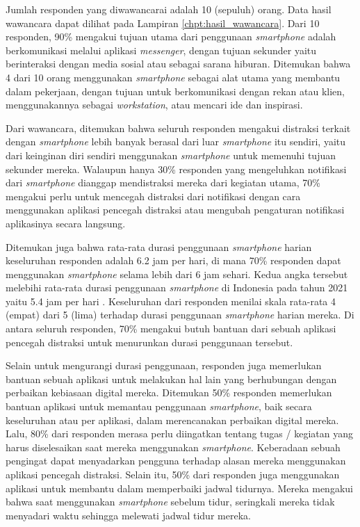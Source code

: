 Jumlah responden yang diwawancarai adalah 10 (sepuluh) orang. Data hasil wawancara dapat dilihat pada Lampiran \ref{chpt:hasil_wawancara}. Dari 10 responden, 90\% mengakui tujuan utama dari penggunaan \textit{smartphone} adalah berkomunikasi melalui aplikasi \textit{messenger}, dengan tujuan sekunder yaitu berinteraksi dengan media sosial atau sebagai sarana hiburan. Ditemukan bahwa 4 dari 10 orang menggunakan \textit{smartphone} sebagai alat utama yang membantu dalam pekerjaan, dengan tujuan untuk berkomunikasi dengan rekan atau klien, menggunakannya sebagai \textit{workstation}, atau mencari ide dan inspirasi.

Dari wawancara, ditemukan bahwa seluruh responden mengakui distraksi terkait dengan \textit{smartphone} lebih banyak berasal dari luar \textit{smartphone} itu sendiri, yaitu dari keinginan diri sendiri menggunakan \textit{smartphone} untuk memenuhi tujuan sekunder mereka. Walaupun hanya 30\% responden yang mengeluhkan notifikasi dari \textit{smartphone} dianggap mendistraksi mereka dari kegiatan utama, 70\% mengakui perlu untuk mencegah distraksi dari notifikasi dengan cara menggunakan aplikasi pencegah distraksi atau mengubah pengaturan notifikasi aplikasinya secara langsung.

Ditemukan juga bahwa rata-rata durasi penggunaan \textit{smartphone} harian keseluruhan responden adalah 6.2 jam per hari, di mana 70\% responden dapat menggunakan \textit{smartphone} selama lebih dari 6 jam sehari. Kedua angka tersebut melebihi rata-rata durasi penggunaan \textit{smartphone} di Indonesia pada tahun 2021 yaitu 5.4 jam per hari \parencite{dataai2022smartphoneindonesia}.  Keseluruhan dari responden menilai skala rata-rata 4 (empat) dari 5 (lima) terhadap durasi penggunaan \textit{smartphone} harian mereka. Di antara seluruh responden, 70\% mengakui butuh bantuan dari sebuah aplikasi pencegah distraksi untuk menurunkan durasi penggunaan tersebut.

Selain untuk mengurangi durasi penggunaan, responden juga memerlukan bantuan sebuah aplikasi untuk melakukan hal lain yang berhubungan dengan perbaikan kebiasaan digital mereka. Ditemukan 50\% responden memerlukan bantuan aplikasi untuk memantau penggunaan \textit{smartphone}, baik secara keseluruhan atau per aplikasi, dalam merencanakan perbaikan digital mereka. Lalu, 80\% dari responden merasa perlu diingatkan tentang tugas / kegiatan yang harus diselesaikan saat mereka menggunakan \textit{smartphone}. Keberadaan sebuah pengingat dapat menyadarkan pengguna terhadap alasan mereka menggunakan aplikasi pencegah distraksi. Selain itu, 50\% dari responden juga menggunakan aplikasi untuk membantu dalam memperbaiki jadwal tidurnya. Mereka mengakui bahwa saat menggunakan \textit{smartphone} sebelum tidur, seringkali mereka tidak menyadari waktu sehingga melewati jadwal tidur mereka.


